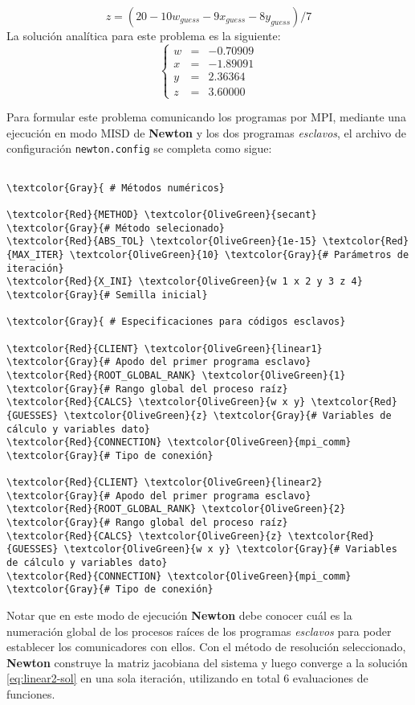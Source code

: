 \begin{equation}
 z = (20 - 10w_{guess} -  9x_{guess} - 8y_{guess})/ 7
 \label{eq:linear2b}
\end{equation}
La solución analítica para este problema es la siguiente:
\begin{equation}
\left\{ \begin{array}{rcl}
 w &=& -0.70909 \\
 x &=& -1.89091 \\
 y &=& 2.36364 \\
 z &=& 3.60000
\end{array}
\right.
\label{eq:linear2-sol}
\end{equation}

Para formular este problema comunicando los programas por MPI,
mediante una ejecución en modo MISD de \textbf{Newton} y los dos programas \textit{esclavos},
el archivo de configuración \texttt{newton.config} se completa como sigue:

\begin{Verbatim}[frame=single,commandchars=\\\{\}]

\textcolor{Gray}{ # Métodos numéricos}

\textcolor{Red}{METHOD} \textcolor{OliveGreen}{secant} \textcolor{Gray}{# Método selecionado}
\textcolor{Red}{ABS_TOL} \textcolor{OliveGreen}{1e-15} \textcolor{Red}{MAX_ITER} \textcolor{OliveGreen}{10} \textcolor{Gray}{# Parámetros de iteración}
\textcolor{Red}{X_INI} \textcolor{OliveGreen}{w 1 x 2 y 3 z 4} \textcolor{Gray}{# Semilla inicial}

\textcolor{Gray}{ # Especificaciones para códigos esclavos}

\textcolor{Red}{CLIENT} \textcolor{OliveGreen}{linear1} \textcolor{Gray}{# Apodo del primer programa esclavo}
\textcolor{Red}{ROOT_GLOBAL_RANK} \textcolor{OliveGreen}{1} \textcolor{Gray}{# Rango global del proceso raíz}
\textcolor{Red}{CALCS} \textcolor{OliveGreen}{w x y} \textcolor{Red}{GUESSES} \textcolor{OliveGreen}{z} \textcolor{Gray}{# Variables de cálculo y variables dato}
\textcolor{Red}{CONNECTION} \textcolor{OliveGreen}{mpi_comm} \textcolor{Gray}{# Tipo de conexión}

\textcolor{Red}{CLIENT} \textcolor{OliveGreen}{linear2} \textcolor{Gray}{# Apodo del primer programa esclavo}
\textcolor{Red}{ROOT_GLOBAL_RANK} \textcolor{OliveGreen}{2}  \textcolor{Gray}{# Rango global del proceso raíz}
\textcolor{Red}{CALCS} \textcolor{OliveGreen}{z} \textcolor{Red}{GUESSES} \textcolor{OliveGreen}{w x y} \textcolor{Gray}{# Variables de cálculo y variables dato}
\textcolor{Red}{CONNECTION} \textcolor{OliveGreen}{mpi_comm} \textcolor{Gray}{# Tipo de conexión}

\end{Verbatim}

Notar que en este modo de ejecución \textbf{Newton} debe conocer 
cuál es la numeración global de los procesos raíces de los programas \textit{esclavos} para poder establecer los comunicadores con ellos.
Con el método de resolución seleccionado, \textbf{Newton} construye la matriz jacobiana del sistema y luego converge a la solución \ref{eq:linear2-sol} en una sola iteración,
utilizando en total  6 evaluaciones de funciones.
